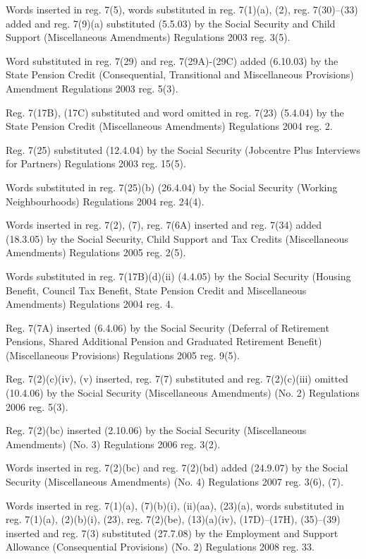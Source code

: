 \documentclass[12pt,a4paper]{article}
\begin{document}
{Words inserted in reg. 7(5), words substituted in reg. 7(1)(a), (2), reg. 7(30)--(33) added and reg. 7(9)(a) substituted (5.5.03) by the Social Security and Child Support (Miscellaneous Amendments) Regulations 2003 reg. 3(5).

Word substituted in reg. 7(29) and reg. 7(29A)-(29C) added (6.10.03) by the State Pension Credit (Consequential, Transitional and Miscellaneous Provisions) Amendment Regulations 2003 reg. 5(3).

Reg. 7(17B), (17C) substituted and word omitted in reg. 7(23) (5.4.04) by the State Pension Credit (Miscellaneous Amendments) Regulations 2004 reg. 2.

Reg. 7(25) substituted (12.4.04) by the Social Security (Jobcentre Plus Interviews for Partners) Regulations 2003 reg. 15(5).

Words substituted in reg. 7(25)(b) (26.4.04) by the Social Security (Working Neighbourhoods) Regulations 2004 reg. 24(4).

Words inserted in reg. 7(2), (7), reg. 7(6A) inserted and reg. 7(34) added (18.3.05) by the Social Security, Child Support and Tax Credits (Miscellaneous Amendments) Regulations 2005 reg. 2(5).

Words substituted in reg. 7(17B)(d)(ii) (4.4.05) by the Social Security (Housing Benefit, Council Tax Benefit, State Pension Credit and Miscellaneous Amendments) Regulations 2004 reg. 4.

Reg. 7(7A) inserted (6.4.06) by the Social Security (Deferral of Retirement Pensions, Shared Additional Pension and Graduated Retirement Benefit) (Miscellaneous Provisions) Regulations 2005 reg. 9(5).

Reg. 7(2)(c)(iv), (v) inserted, reg. 7(7) substituted and reg. 7(2)(c)(iii) omitted (10.4.06) by the Social Security (Miscellaneous Amendments) (No. 2) Regulations 2006 reg. 5(3).

Reg. 7(2)(bc) inserted (2.10.06) by the Social Security (Miscellaneous Amendments) (No. 3) Regulations 2006 reg. 3(2).

Words inserted in reg. 7(2)(bc) and reg. 7(2)(bd) added (24.9.07) by the Social Security (Miscellaneous Amendments) (No. 4) Regulations 2007 reg. 3(6), (7).

\begin{sloppypar}
Words inserted in reg. 7(1)(a), (7)(b)(i), (ii)(aa), (23)(a), words substituted in reg. 7(1)(a), (2)(b)(i), (23), reg. 7(2)(be), (13)(a)(iv), (17D)--(17H), (35)--(39) inserted and reg. 7(3) substituted (27.7.08) by the Employment and Support Allowance (Consequential Provisions) (No. 2) Regulations 2008 reg. 33.
\end{sloppypar}

}
\end{document}
